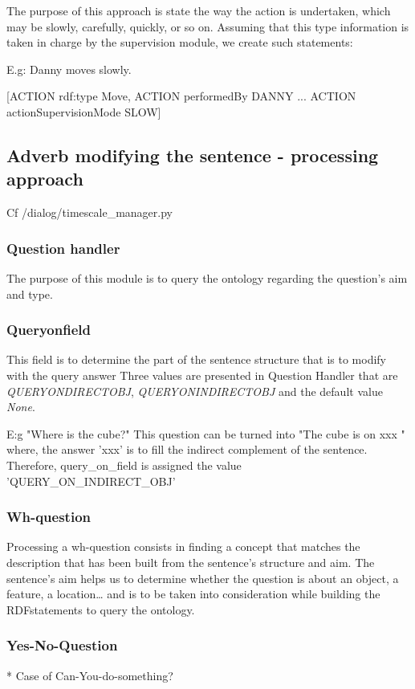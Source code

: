 \documentclass[twoside,a4paper,10pt]{report}
\newcommand{\dokutitleleveltree}[1]{\subsection{#1}}
\newcommand{\dokutitlelevelfour}[1]{\subsubsection{#1}}
\newcommand{\dokufootmark}[1]{\footnotemark[#1]}
\newcommand{\dokuitalic}[1]{\textsl{#1}}
\begin{document}
The purpose of this approach is state the way the action is undertaken, which may be slowly, carefully, quickly, or so on.
Assuming that this type information is taken in charge by the supervision module, we create such statements:


\small
\begin{verbatimtab}
  
  E.g: Danny moves slowly.
  
  [ACTION rdf:type Move,
  ACTION performedBy DANNY
  ...
  ACTION actionSupervisionMode SLOW]
  
\end{verbatimtab}
\normalsize

\dokutitleleveltree{Adverb modifying the sentence - processing approach}
\label{c09cf52af4b6af491e8452be15d2b9d4}%

\small
\begin{verbatimtab}
  Cf /dialog/timescale_manager.py
  
\end{verbatimtab}
\normalsize

\dokutitlelevelfour{Question handler}

The purpose of this module is to query the ontology regarding the question's aim and type.



\dokutitlelevelfour{Query{\textunderscore}on{\textunderscore}field}

This field is to determine the part of the sentence structure that is to modify with the query answer
Three values are presented in Question Handler that are \dokuitalic{QUERY{\textunderscore}ON{\textunderscore}DIRECT{\textunderscore}OBJ}, \dokuitalic{QUERY{\textunderscore}ON{\textunderscore}INDIRECT{\textunderscore}OBJ} and the default value \dokuitalic{None}.


\small
\begin{verbatimtab}
  
  E:g "Where is the cube?"
  This question can be turned into 
      "The cube is on xxx "
  where, the answer 'xxx' is to fill the indirect complement of the sentence.
  Therefore, query_on_field is assigned the value 'QUERY_ON_INDIRECT_OBJ'
  
\end{verbatimtab}
\normalsize

\dokutitlelevelfour{Wh-question}
Processing a wh-question consists in finding a concept that matches the description that has been built from the sentence's structure and aim.
The sentence's aim helps us to determine whether the question is about an object, a feature, a location\ldots{} and is to be taken into consideration while building the RDF\dokufootmark{1} statements to query the ontology.


\dokutitlelevelfour{Yes-No-Question}

* Case of Can-You-do-something?
\end{document}
